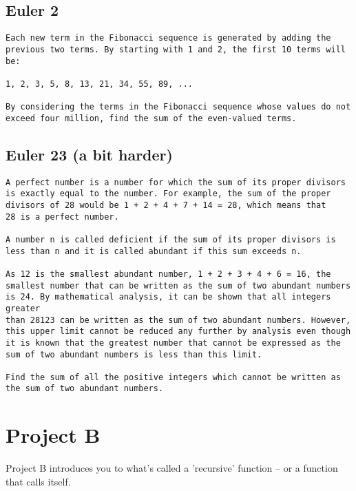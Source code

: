 \documentclass[11pt]{article}
\begin{document}
\subsection{Euler 2}
\label{sec:orga227795}
\begin{verbatim}
Each new term in the Fibonacci sequence is generated by adding the
previous two terms. By starting with 1 and 2, the first 10 terms will be:

1, 2, 3, 5, 8, 13, 21, 34, 55, 89, ...

By considering the terms in the Fibonacci sequence whose values do not
exceed four million, find the sum of the even-valued terms.
\end{verbatim}

\subsection{Euler 23 (a bit harder)}
\label{sec:orgb1dba68}
\begin{verbatim}
A perfect number is a number for which the sum of its proper divisors
is exactly equal to the number. For example, the sum of the proper
divisors of 28 would be 1 + 2 + 4 + 7 + 14 = 28, which means that
28 is a perfect number.

A number n is called deficient if the sum of its proper divisors is
less than n and it is called abundant if this sum exceeds n.

As 12 is the smallest abundant number, 1 + 2 + 3 + 4 + 6 = 16, the
smallest number that can be written as the sum of two abundant numbers
is 24. By mathematical analysis, it can be shown that all integers greater
than 28123 can be written as the sum of two abundant numbers. However,
this upper limit cannot be reduced any further by analysis even though
it is known that the greatest number that cannot be expressed as the
sum of two abundant numbers is less than this limit.

Find the sum of all the positive integers which cannot be written as
the sum of two abundant numbers.
\end{verbatim}



\section{Project B}
\label{sec:orgf64ff44}
Project B introduces you to what's called a 'recursive' function -- or a function that calls itself.\\
\end{document}
